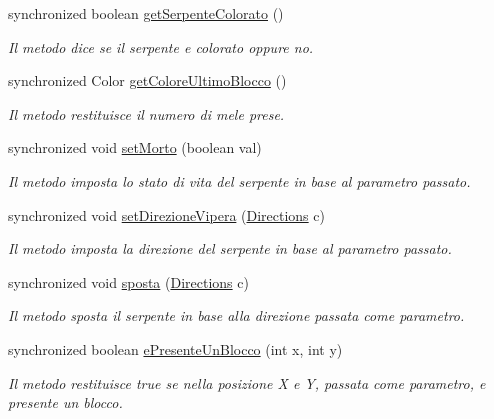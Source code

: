 \begin{DoxyCompactItemize}
synchronized boolean \mbox{\hyperlink{class_snake_1_1game_1_1gioco_a8285102d15107685676f4ba0b6029d87}{get\+Serpente\+Colorato}} ()
\begin{DoxyCompactList}\small\item\em Il metodo dice se il serpente e\textquotesingle{} colorato oppure no. \end{DoxyCompactList}\item 
synchronized Color \mbox{\hyperlink{class_snake_1_1game_1_1gioco_aa28f45b4849720b24778146d20f7be0b}{get\+Colore\+Ultimo\+Blocco}} ()
\begin{DoxyCompactList}\small\item\em Il metodo restituisce il numero di mele prese. \end{DoxyCompactList}\item 
synchronized void \mbox{\hyperlink{class_snake_1_1game_1_1gioco_a118b98e3108dd550bb66d06db01eac41}{set\+Morto}} (boolean val)
\begin{DoxyCompactList}\small\item\em Il metodo imposta lo stato di vita del serpente in base al parametro passato. \end{DoxyCompactList}\item 
synchronized void \mbox{\hyperlink{class_snake_1_1game_1_1gioco_ac6bacbb78b013d51f31d65501e08522e}{set\+Direzione\+Vipera}} (\mbox{\hyperlink{enum_snake_1_1game_1_1utility_1_1_directions}{Directions}} c)
\begin{DoxyCompactList}\small\item\em Il metodo imposta la direzione del serpente in base al parametro passato. \end{DoxyCompactList}\item 
synchronized void \mbox{\hyperlink{class_snake_1_1game_1_1gioco_ad62cb3f928d2518fde54d64970bb850d}{sposta}} (\mbox{\hyperlink{enum_snake_1_1game_1_1utility_1_1_directions}{Directions}} c)
\begin{DoxyCompactList}\small\item\em Il metodo sposta il serpente in base alla direzione passata come parametro. \end{DoxyCompactList}\item 
synchronized boolean \mbox{\hyperlink{class_snake_1_1game_1_1gioco_a0b9510c56170e691e67ab6308a4bd1f6}{e\+Presente\+Un\+Blocco}} (int x, int y)
\begin{DoxyCompactList}\small\item\em Il metodo restituisce true se nella posizione X e Y, passata come parametro, e\textquotesingle{} presente un blocco. \end{DoxyCompactList}\item 

\end{DoxyCompactItemize}
